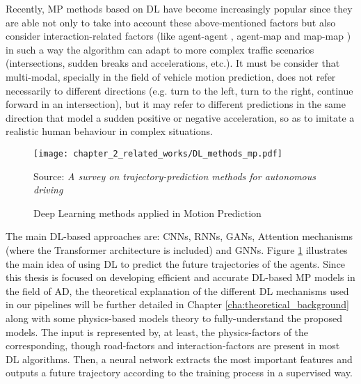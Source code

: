 Recently, MP methods based on DL have become increasingly popular since they are able not only to take into account these above-mentioned factors but also consider interaction-related factors (like agent-agent \cite{gupta2018social}, agent-map \cite{casas2018intentnet} and map-map \cite{liang2020learning}) in such a way the algorithm can adapt to more complex traffic scenarios (intersections, sudden breaks and accelerations, etc.). It must be consider that multi-modal, specially in the field of vehicle motion prediction, does not refer necessarily to different directions (e.g. turn to the left, turn to the right, continue forward in an intersection), but it may refer to different predictions in the same direction that model a sudden positive or negative acceleration, so as to imitate a realistic human behaviour in complex situations. %

\begin{figure}[h]
	\centering
	\texttt{[image: chapter\_2\_related\_works/DL\_methods\_mp.pdf]}
	\caption{Deep Learning methods applied in Motion Prediction}
	Source: \textit{A survey on trajectory-prediction methods for autonomous driving} \cite{huang2022survey}
	\label{fig:chapter_2_related_works/DL_example_mp}
\end{figure}

The main DL-based approaches are: \acp{CNN}, \acp{RNN}, \acp{GAN}, Attention mechanisms (where the Transformer architecture is included) and \acp{GNN}. Figure \ref{fig:chapter_2_related_works/DL_example_mp} illustrates the main idea of using \ac{DL} to predict the future trajectories of the agents. Since this thesis is focused on developing efficient and accurate \ac{DL}-based \ac{MP} models in the field of \ac{AD}, the theoretical explanation of the different \ac{DL} mechanisms used in our pipelines will be further detailed in Chapter \ref{cha:theoretical_background} along with some physics-based models theory to fully-understand the proposed models. The input is represented by, at least, the physics-factors of the corresponding, though road-factors and interaction-factors are present in most \ac{DL} algorithms. Then, a neural network extracts the most important features and outputs a future trajectory according to the training process in a supervised way. 

